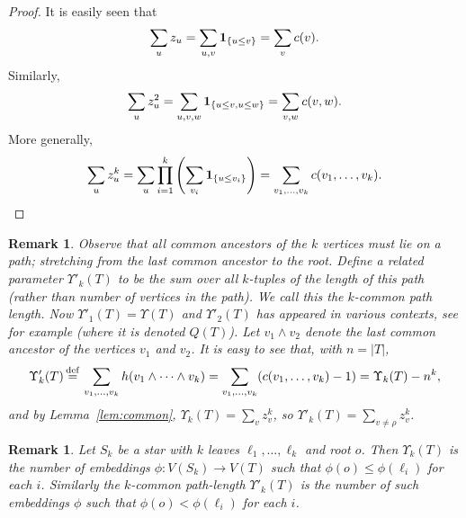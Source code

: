 \documentclass[11pt]{article}
\newcommand{\ind}{{\bf 1}}
\def\U{\Upsilon}
\numberwithin{theorem}{section}
\newtheorem{remark}[theorem]{Remark}
\theoremstyle{definition}
\newcommand{\eqd}{\,{\buildrel {\mathrm{def}} \over =}\,}
\numberwithin{equation}{section}
\begin{document}
\begin{proof}
It is easily seen that
\begin{equation}
    \sum_{u} z_u = \sum_{u, v} {\ind}_{\{u \le v\}} = \sum_{v} c(v) 
    .
\end{equation}
Similarly, 
\begin{equation}
    \sum_{u} z_u^2 = \sum_{u,v,w}{\ind}_{\{u \le v, u \le w\}} = \sum_{v,w} c(v, w).
\end{equation}
More generally, 
\begin{equation*}
    \sum_{u}z_u^k 
    = \sum_u \prod_{i=1}^k \left(\sum_{v_i} {\ind}_{\{u \le v_i\}}\right) 
    = \sum_{v_1,\dots,v_k} c(v_{1},\dots,v_{k})
    .
    \qedhere
\end{equation*}
\end{proof}

\begin{remark}
Observe that all common ancestors of the $k$
vertices must lie on a path; stretching from the last common ancestor to the root. Define a related
parameter $\U'_k(T)$ to be 
the sum over all $k$-tuples of
the length of this path  (rather than number of vertices in the path). 
We call this the \emph{$k$-common path length}. Now $\U'_1(T)=\U(T)$ and
$\U'_2(T)$ has appeared in various contexts, see for example \cite{j02}
(where it is denoted $Q(T)$).
Let $v_1 \land v_2$ denote the last common ancestor of the vertices $v_1$
and $v_2$. 
It is easy to see that, with $n=|T|$,
\[
    \Upsilon'_{k}(T) 
    \eqd
\sum_{v_1,\dots,v_k} h(v_{1} \land \dots \land v_{k})
    =
    \sum_{v_1,\dots,v_k} (c(v_{1},\dots,v_{k}) -1)   
    =
     \U_{k}(T) - n^{k},\]
and by Lemma~\ref{lem:common}, $\U_{k}(T)=\sum_v z_v^k$, so $\U'_{k}(T)=\sum_{v\neq \rho} z_v^k$.
\end{remark}

\begin{remark}
Let $S_k$ be a star with $k$ leaves $\ell_1, \dots,\ell_k$ and root
$o$. Then $\U_k(T)$ is the number of embeddings $\phi:V(S_k)\rightarrow V(T)$ such that
$\phi(o) \leq \phi(\ell_i)$ for each $i$.  Similarly the $k$-common path-length $\U'_k(T)$ is the
number of such embeddings $\phi$ such that $\phi(o) < \phi(\ell_i)$ for each $i$.
\end{remark}
\end{document}
